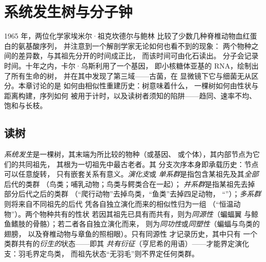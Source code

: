 \chapter{系统发生树与分子钟}\label{ch:b2:phylogenetic-trees}

1965 年，两位化学家埃米尔·祖克坎德尔与鲍林
比较了少数几种脊椎动物血红蛋白的氨基酸序列，
并注意到一个解剖学家无论如何也看不到的现象：
两个物种之间的差异数，与其祖先分开的时间成正比，
而该时间可由化石读出。
分子会记录时间。十年之内，卡尔·乌斯利用了一个基因，
即小核糖体亚基的 RNA，绘制出了所有生命的树，
并在其中发现了第三域——古菌，在
显微镜下它与细菌无从区分。本章讨论的是
如何由相似性重建历史：树意味着什么，
一棵树如何由性状与距离构建，序列如何
被用于计时，以及读树者须知的陷阱——趋同、速率不均、
饱和与长枝。

\section{读树}

\begin{definition}\label{def:b2:phylogenetic-trees:tree}
\emph{系统发生}是一棵树，其末端为所比较的物种（或基因、
或个体），其内部节点为它们的共同祖先，
其根为一切祖先中最古老者。其
分支次序本身即承载历史：节点可以任意旋转，
只有嵌套关系有意义。\emph{演化支}或
\emph{单系群}是指包含某祖先及其\emph{全部}后代的类群
（鸟类；哺乳动物；鸟类与鳄类合在一起）；
\emph{并系群}是指某祖先去掉部分后代之后的类群
（“爬行动物”去掉鸟类，“鱼类”去掉四足动物，
“”）；\emph{多系群}则将来自不同祖先的后代
凭各自独立演化而来的相似性归为一组
（“恒温动物”）。两个物种共有的性状
若因其祖先已具有而共有，则为\emph{同源性}（蝙蝠翼
与鲸鱼鳍肢的骨骼）；若二者各自独立演化而来，
则为\emph{同功性}或\emph{同塑性}（蝙蝠与鸟类的翅膀，
以及脊椎动物与章鱼的照相眼）。只有同源性
才记录历史，其中只有
一个类群共有的\emph{衍生的}状态——即其
\emph{共有衍征}（亨尼希的用语）——才能界定演化支：羽毛界定鸟类，
而祖先状态“无羽毛”则不界定任何类群。
\end{definition}

